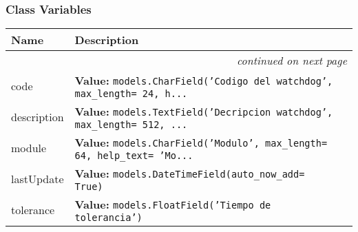   \subsubsection{Class Variables}

    \vspace{-1cm}
\hspace{\varindent}\begin{longtable}{|p{\varnamewidth}|p{\vardescrwidth}|l}
\cline{1-2}
\cline{1-2} \centering \textbf{Name} & \centering \textbf{Description}& \\
\cline{1-2}
\endhead\cline{1-2}\multicolumn{3}{r}{\small\textit{continued on next page}}\\\endfoot\cline{1-2}
\endlastfoot\raggedright c\-o\-d\-e\- & \raggedright \textbf{Value:} 
{\tt models.CharField('Codigo del watchdog', max\_length= 24, h\texttt{...}}&\\
\cline{1-2}
\raggedright d\-e\-s\-c\-r\-i\-p\-t\-i\-o\-n\- & \raggedright \textbf{Value:} 
{\tt models.TextField('Decripcion watchdog', max\_length= 512, \texttt{...}}&\\
\cline{1-2}
\raggedright m\-o\-d\-u\-l\-e\- & \raggedright \textbf{Value:} 
{\tt models.CharField('Modulo', max\_length= 64, help\_text= 'Mo\texttt{...}}&\\
\cline{1-2}
\raggedright l\-a\-s\-t\-U\-p\-d\-a\-t\-e\- & \raggedright \textbf{Value:} 
{\tt models.DateTimeField(auto\_now\_add= True)}&\\
\cline{1-2}
\raggedright t\-o\-l\-e\-r\-a\-n\-c\-e\- & \raggedright \textbf{Value:} 
{\tt models.FloatField('Tiempo de tolerancia')}&\\
\cline{1-2}
\end{longtable}

